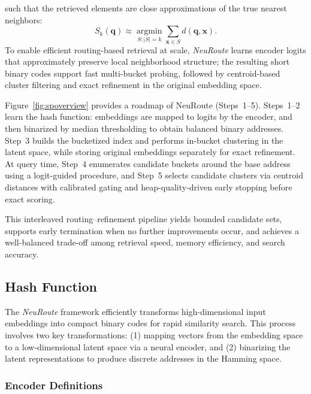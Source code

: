 \documentclass[sigconf, nonacm]{acmart}
\begin{document}
such that the retrieved elements are close approximations of the true nearest neighbors:
\begin{equation}
S_k(\mathbf{q}) \approx \operatorname*{argmin}_{S: |S|=k} \sum_{\mathbf{x} \in S} d(\mathbf{q}, \mathbf{x}).
\end{equation}
To enable efficient routing-based retrieval at scale, \textit{NeuRoute} learns encoder logits that approximately preserve local neighborhood structure; the resulting short binary codes support fast multi-bucket probing, followed by centroid-based cluster filtering and exact refinement in the original embedding space.

Figure~\ref{fig:spoverview} provides a roadmap of NeuRoute (Steps~1--5). 
Steps~1--2 learn the hash function: embeddings are mapped to logits by the encoder, and then binarized by median thresholding to obtain balanced binary addresses. 
Step~3 builds the bucketized index and performs in-bucket clustering in the latent space, while storing original embeddings separately for exact refinement. 
At query time, Step~4 enumerates candidate buckets around the base address using a logit-guided procedure, and Step~5 selects candidate clusters via centroid distances with calibrated gating and heap-quality-driven early stopping before exact scoring.  

This interleaved routing–refinement pipeline yields bounded candidate sets, supports early termination when no further improvements occur, and achieves a well-balanced trade-off among retrieval speed, memory efficiency, and search accuracy.

\subsection{Hash Function}
\label{subsec:hash-function}

The \textit{NeuRoute} framework efficiently transforms high-dimensional input embeddings into compact binary codes for rapid similarity search. This process involves two key transformations: (1) mapping vectors from the embedding space to a low-dimensional latent space via a neural encoder, and (2) binarizing the latent representations to produce discrete addresses in the Hamming space.

\subsubsection{Encoder Definitions}
\label{subsubsec:encoder}
\end{document}

